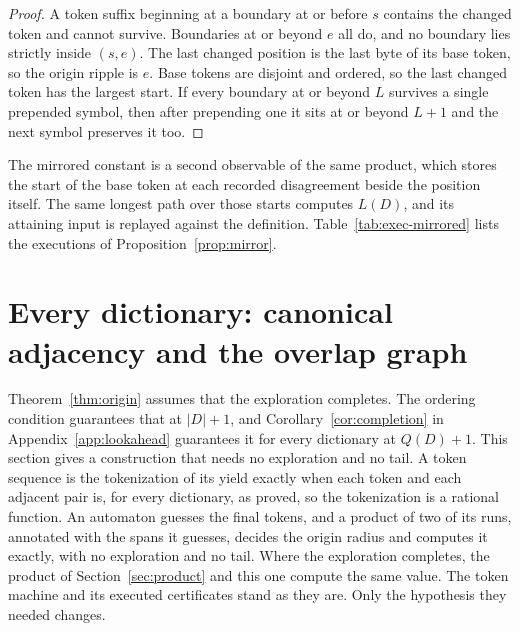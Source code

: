 \documentclass[11pt,a4paper]{article}
\theoremstyle{definition}
\theoremstyle{plain}
\begin{document}
\begin{proof}
A token suffix beginning at a boundary at or before \(s\) contains the changed token and cannot survive. Boundaries at
or beyond \(e\) all do, and no boundary lies strictly inside \((s, e)\). The last changed position is the last byte of
its base token, so the origin ripple is \(e\). Base tokens are disjoint and ordered, so the last changed token has the
largest start. If every boundary at or beyond \(L\) survives a single prepended symbol, then after prepending one it
sits at or beyond \(L + 1\) and the next symbol preserves it too.
\end{proof}

The mirrored constant is a second observable of the same product, which stores the start of the base token at each
recorded disagreement beside the position itself. The same longest path over those starts computes \(L(D)\), and its
attaining input is replayed against the definition. Table~\ref{tab:exec-mirrored} lists the executions of
Proposition~\ref{prop:mirror}.

\section{Every dictionary: canonical adjacency and the overlap graph}\label{sec:overlap}

Theorem~\ref{thm:origin} assumes that the exploration completes. The ordering condition guarantees that at \(|D| + 1\),
and Corollary~\ref{cor:completion} in Appendix~\ref{app:lookahead} guarantees it for every dictionary at \(Q(D) + 1\).
This section gives a construction that needs no exploration and no tail. A token sequence is the tokenization of its
yield exactly when each token and each adjacent pair is, for every dictionary, as \citet{vieira2025canonical} proved, so
the tokenization is a rational function. An automaton guesses the final tokens, and a product of two of its runs,
annotated with the spans it guesses, decides the origin radius and computes it exactly, with no exploration and no tail.
Where the exploration completes, the product of Section~\ref{sec:product} and this one compute the same value. The token
machine and its executed certificates stand as they are. Only the hypothesis they needed changes.

\end{document}
